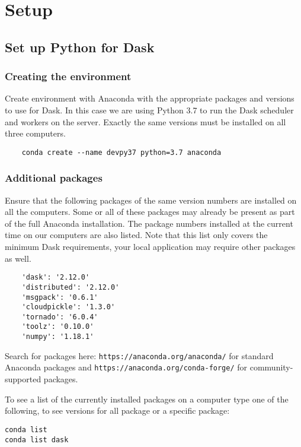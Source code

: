 
\chapter{\libraddask{} Setup}
\label{chap:libraddaskSetup}

\section{Set up Python for Dask}

\subsection{Creating the environment}

Create environment with Anaconda with the appropriate packages and versions to use for Dask.
In this case we are using Python 3.7 to run the Dask scheduler and workers on the server.
Exactly the same versions must be installed on all three computers.

\begin{lstlisting}
    conda create --name devpy37 python=3.7 anaconda
\end{lstlisting}

\subsection{Additional packages}
\label{sec:Additionalpackages}

Ensure that the following packages of the same version numbers are installed on all the computers. 
Some or all of these packages may already be present as part of the full Anaconda installation.
The package numbers installed at the current time on our computers are also listed.
Note that this list only covers the minimum Dask requirements, your local application may require other packages as well.
\begin{lstlisting}
    'dask': '2.12.0'
    'distributed': '2.12.0'
    'msgpack': '0.6.1'
    'cloudpickle': '1.3.0'
    'tornado': '6.0.4'
    'toolz': '0.10.0'
    'numpy': '1.18.1'
\end{lstlisting}

Search for packages here: 
\lstinline{https://anaconda.org/anaconda/} for standard Anaconda packages and 
\lstinline{https://anaconda.org/conda-forge/} for community-supported packages.

To see a list of the currently installed packages on a computer type one of the following, to see versions for all package or a specific package:
\begin{lstlisting}
conda list
conda list dask
\end{lstlisting}

